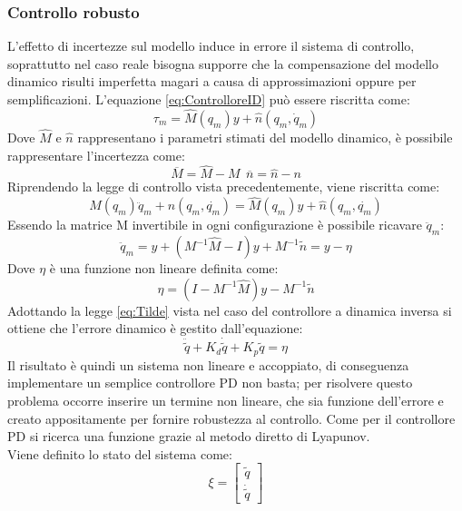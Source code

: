 \subsubsection{Controllo robusto}
 L'effetto di incertezze sul modello induce in errore il sistema di controllo, soprattutto nel caso reale bisogna supporre che la compensazione del modello dinamico risulti imperfetta magari a causa di approssimazioni oppure per semplificazioni.  L'equazione \ref{eq:ControlloreID} può essere riscritta come:
\begin{equation}
\tau_m = \hat{M}(q_m)y + \hat{n}(q_m,\dot{q}_m)
\end{equation}
Dove $\hat{M}$ e $\hat{n}$ rappresentano i parametri stimati del modello dinamico, è possibile rappresentare l'incertezza come:
\begin{equation*}
\overline{M} = \hat{M}- M \ \ \overline{n} = \hat{n} - n
\end{equation*}  
Riprendendo la legge di controllo vista precedentemente, viene riscritta come:
\begin{equation}
M(q_m)\ddot{q}_m + n(q_m,\dot{q_m}) = \hat{M}(q_m)y + \hat{n}(q_m,\dot{q_m})
\end{equation}
Essendo la matrice M invertibile in ogni configurazione è possibile ricavare $\ddot{q}_m$:
\begin{equation*}
\ddot{q}_m = y + (M^{-1}\hat{M}-I)y+M^{-1}\tilde{n} = y-\eta
\end{equation*}
Dove $\eta$ è una funzione non lineare definita come: \begin{equation}
\eta = (I-M^{-1}\hat{M})y - M^{-1}\tilde{n} 
\end{equation}
Adottando la legge \ref{eq:Tilde} vista nel caso del controllore a dinamica inversa si ottiene che l'errore dinamico è gestito dall'equazione:
\begin{equation}
\ddot{\tilde{q}} + K_d \dot{\tilde{q}} + K_p\tilde{q} = \eta
\end{equation}
Il risultato è quindi un sistema non lineare e accoppiato, di conseguenza implementare un semplice controllore PD non basta; per risolvere questo problema occorre inserire un termine non lineare, che sia funzione dell'errore e creato appositamente per fornire robustezza al controllo. Come per il controllore PD si ricerca una funzione grazie al metodo diretto di Lyapunov. 
\\Viene definito lo stato del sistema come:
\begin{equation*}
\xi = \begin{bmatrix}
\tilde{q} \\ \dot{\tilde{q}}
\end{bmatrix}
\end{equation*}
